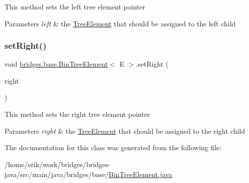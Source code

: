 This method sets the left tree element pointer 
\begin{DoxyParams}{Parameters}
{\em left} & the \hyperlink{classbridges_1_1base_1_1_tree_element}{Tree\+Element} that should be assigned to the left child \\
\hline
\end{DoxyParams}
\mbox{\label{classbridges_1_1base_1_1_bin_tree_element_abc40e3ed4cfaf4b74aacfd3657e89ebc}} 
\subsubsection{\texorpdfstring{set\+Right()}{setRight()}}
{\footnotesize\ttfamily void \hyperlink{classbridges_1_1base_1_1_bin_tree_element}{bridges.\+base.\+Bin\+Tree\+Element}$<$ E $>$.set\+Right (\begin{DoxyParamCaption}\item[{\hyperlink{classbridges_1_1base_1_1_bin_tree_element}{Bin\+Tree\+Element}$<$ E $>$}]{right }\end{DoxyParamCaption})}

This method sets the right tree element pointer


\begin{DoxyParams}{Parameters}
{\em right} & the \hyperlink{classbridges_1_1base_1_1_tree_element}{Tree\+Element} that should be assigned to the right child \\
\hline
\end{DoxyParams}


The documentation for this class was generated from the following file\+:\begin{DoxyCompactItemize}
\item 
/home/erik/work/bridges/bridges-\/java/src/main/java/bridges/base/\hyperlink{_bin_tree_element_8java}{Bin\+Tree\+Element.\+java}\end{DoxyCompactItemize}
